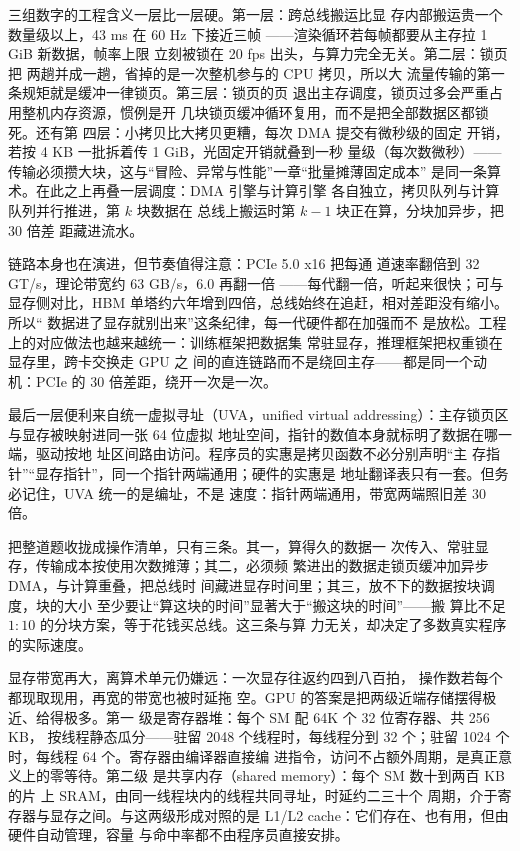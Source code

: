 三组数字的工程含义一层比一层硬。第一层：跨总线搬运比显
存内部搬运贵一个数量级以上，43 ms 在 60 Hz 下接近三帧
——渲染循环若每帧都要从主存拉 1 GiB 新数据，帧率上限
立刻被锁在 20 fps 出头，与算力完全无关。第二层：锁页把
两趟并成一趟，省掉的是一次整机参与的 CPU 拷贝，所以大
流量传输的第一条规矩就是缓冲一律锁页。第三层：锁页的页
退出主存调度，锁页过多会严重占用整机内存资源，惯例是开
几块锁页缓冲循环复用，而不是把全部数据区都锁死。还有第
四层：小拷贝比大拷贝更糟，每次 DMA 提交有微秒级的固定
开销，若按 4 KB 一批拆着传 1 GiB，光固定开销就叠到一秒
量级（每次数微秒）——传输必须攒大块，这与“冒险、异常与性能”一章“批量摊薄固定成本”
是同一条算术。在此之上再叠一层调度：DMA 引擎与计算引擎
各自独立，拷贝队列与计算队列并行推进，第 $k$ 块数据在
总线上搬运时第 $k-1$ 块正在算，分块加异步，把 30 倍差
距藏进流水。

链路本身也在演进，但节奏值得注意：PCIe 5.0 x16 把每通
道速率翻倍到 32 GT/s，理论带宽约 63 GB/s，6.0 再翻一倍
——每代翻一倍，听起来很快；可与显存侧对比，HBM 单塔约六年增到四倍，总线始终在追赶，相对差距没有缩小。所以“
数据进了显存就别出来”这条纪律，每一代硬件都在加强而不
是放松。工程上的对应做法也越来越统一：训练框架把数据集
常驻显存，推理框架把权重锁在显存里，跨卡交换走 GPU 之
间的直连链路而不是绕回主存——都是同一个动机：PCIe 的
30 倍差距，绕开一次是一次。

最后一层便利来自统一虚拟寻址（UVA，unified virtual
addressing）：主存锁页区与显存被映射进同一张 64 位虚拟
地址空间，指针的数值本身就标明了数据在哪一端，驱动按地
址区间路由访问。程序员的实惠是拷贝函数不必分别声明“主
存指针”“显存指针”，同一个指针两端通用；硬件的实惠是
地址翻译表只有一套。但务必记住，UVA 统一的是编址，不是
速度：指针两端通用，带宽两端照旧差 30 倍。

把整道题收拢成操作清单，只有三条。其一，算得久的数据一
次传入、常驻显存，传输成本按使用次数摊薄；其二，必须频
繁进出的数据走锁页缓冲加异步 DMA，与计算重叠，把总线时
间藏进显存时间里；其三，放不下的数据按块调度，块的大小
至少要让“算这块的时间”显著大于“搬这块的时间”——搬
算比不足 $1:10$ 的分块方案，等于花钱买总线。这三条与算
力无关，却决定了多数真实程序的实际速度。

显存带宽再大，离算术单元仍嫌远：一次显存往返约四到八百拍，
操作数若每个都现取现用，再宽的带宽也被时延拖
空。GPU 的答案是把两级近端存储摆得极近、给得极多。第一
级是寄存器堆：每个 SM 配 64K 个 32 位寄存器、共 256 KB，
按线程静态瓜分——驻留 2048 个线程时，每线程分到 32
个；驻留 1024 个时，每线程 64 个。寄存器由编译器直接编
进指令，访问不占额外周期，是真正意义上的零等待。第二级
是共享内存（shared memory）：每个 SM 数十到两百 KB 的片
上 SRAM，由同一线程块内的线程共同寻址，时延约二三十个
周期，介于寄存器与显存之间。与这两级形成对照的是
L1/L2 cache：它们存在、也有用，但由硬件自动管理，容量
与命中率都不由程序员直接安排。

